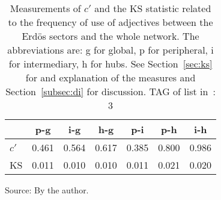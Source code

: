 \begin{table}[h!]
\begin{center}
\caption{Measurements of $c'$ and the KS statistic related to the frequency of use of adjectives between the Erd\"os sectors and the whole network. The abbreviations are: g for global, p for peripheral, i for intermediary, h for hubs. See Section~\ref{sec:ks} for and explanation of the measures and Section~\ref{subsec:di} for discussion. TAG of list in~\cite{textTables}: 3}
\begin{tabular}{l || c | c | c | c | c | c}\hline
{\bf } & {\bf p-g} & {\bf i-g} & {\bf h-g} & {\bf p-i} & {\bf p-h} & {\bf i-h} \\\hline\hline
$c'$ & 0.461  & 0.564  & 0.617  & 0.385  & 0.800  & 0.986 \\
KS & 0.011  & 0.010  & 0.010  & 0.011  & 0.021  & 0.020 \\\hline
\end{tabular}
\begin{flushleft}\footnotesize
Source: By the author.\
\end{flushleft}
\end{center}
\end{table}
